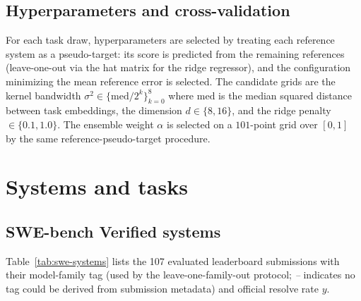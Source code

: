 \documentclass{article}
\begin{document}
\subsection{Hyperparameters and cross-validation}
\label{app:hyper}

For each task draw, hyperparameters are selected by treating each reference system as a pseudo-target: its score is predicted from the remaining references (leave-one-out via the hat matrix for the ridge regressor), and the configuration minimizing the mean reference error is selected.
The candidate grids are the kernel bandwidth $\sigma^{2} \in \{\mathrm{med}/2^{k}\}_{k=0}^{8}$ where $\mathrm{med}$ is the median squared distance between task embeddings, the dimension $d \in \{8, 16\}$, and the ridge penalty $\in \{0.1, 1.0\}$.
The ensemble weight $\alpha$ is selected on a $101$-point grid over $[0, 1]$ by the same reference-pseudo-target procedure.


\section{Systems and tasks}
\label{app:data}

\subsection{SWE-bench Verified systems}
Table~\ref{tab:swe-systems} lists the 107 evaluated leaderboard submissions with their model-family tag (used by the leave-one-family-out protocol; \emph{--} indicates no tag could be derived from submission metadata) and official resolve rate $y$.
\end{document}

